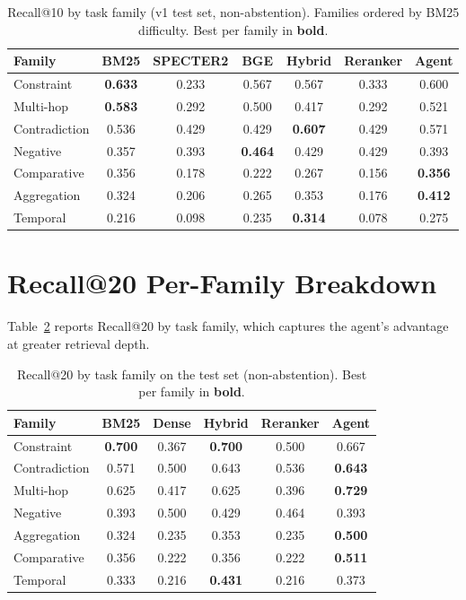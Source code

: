 \documentclass{article}
\begin{document}
\begin{table}[h]
\centering
\caption{Recall@10 by task family (v1 test set, non-abstention). Families ordered by BM25 difficulty. Best per family in \textbf{bold}.}
\label{tab:perfamily}
\small
\begin{tabular}{lcccccc}
\toprule
\textbf{Family} & \textbf{BM25} & \textbf{SPECTER2} & \textbf{BGE} & \textbf{Hybrid} & \textbf{Reranker} & \textbf{Agent} \\
\midrule
Constraint     & \textbf{0.633} & 0.233 & 0.567 & 0.567 & 0.333 & 0.600 \\
Multi-hop      & \textbf{0.583} & 0.292 & 0.500 & 0.417 & 0.292 & 0.521 \\
Contradiction  & 0.536 & 0.429 & 0.429 & \textbf{0.607} & 0.429 & 0.571 \\
Negative       & 0.357 & 0.393 & \textbf{0.464} & 0.429 & 0.429 & 0.393 \\
Comparative    & 0.356 & 0.178 & 0.222 & 0.267 & 0.156 & \textbf{0.356} \\
Aggregation    & 0.324 & 0.206 & 0.265 & 0.353 & 0.176 & \textbf{0.412} \\
Temporal       & 0.216 & 0.098 & 0.235 & \textbf{0.314} & 0.078 & 0.275 \\
\bottomrule
\end{tabular}
\end{table}

\section{Recall@20 Per-Family Breakdown}
\label{app:recall20}

Table~\ref{tab:perfamily20} reports Recall@20 by task family, which captures the agent's advantage at greater retrieval depth.

\begin{table}[h]
\centering
\caption{Recall@20 by task family on the test set (non-abstention). Best per family in \textbf{bold}.}
\label{tab:perfamily20}
\small
\begin{tabular}{lccccc}
\toprule
\textbf{Family} & \textbf{BM25} & \textbf{Dense} & \textbf{Hybrid} & \textbf{Reranker} & \textbf{Agent} \\
\midrule
Constraint & \textbf{0.700} & 0.367 & \textbf{0.700} & 0.500 & 0.667 \\
Contradiction & 0.571 & 0.500 & 0.643 & 0.536 & \textbf{0.643} \\
Multi-hop & 0.625 & 0.417 & 0.625 & 0.396 & \textbf{0.729} \\
Negative & 0.393 & 0.500 & 0.429 & 0.464 & 0.393 \\
Aggregation & 0.324 & 0.235 & 0.353 & 0.235 & \textbf{0.500} \\
Comparative & 0.356 & 0.222 & 0.356 & 0.222 & \textbf{0.511} \\
Temporal & 0.333 & 0.216 & \textbf{0.431} & 0.216 & 0.373 \\
\bottomrule
\end{tabular}
\end{table}
\end{document}
